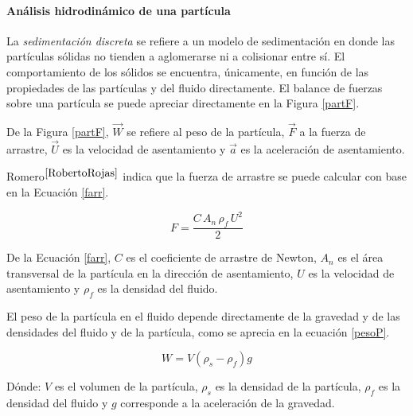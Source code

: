 \paragraph{An\'alisis hidrodin\'amico de una part\'icula} \label{hidroD}

\noindent
\justify

La \textit{sedimentaci\'on discreta} se refiere a un modelo de sedimentaci\'on en donde las part\'iculas s\'olidas no tienden a aglomerarse ni a colisionar entre s\'i. El comportamiento de los s\'olidos se encuentra, \'unicamente, en funci\'on de las propiedades de las part\'iculas y del fluido directamente. El balance de fuerzas sobre una part\'icula se puede apreciar directamente en la Figura \ref{partF}.



\noindent
\justify


De la Figura \ref{partF}, $\vec{W}$ se refiere al peso de la part\'icula, $\vec{F}$ a la fuerza de arrastre, $\vec{U}$ es la velocidad de asentamiento y $\vec{a}$ es la aceleraci\'on de asentamiento.

\noindent
\justify

Romero$^{\cite{RobertoRojas}}$ indica que la fuerza de arrastre se puede calcular con base en la Ecuaci\'on \ref{farr}.

\begin{equation}
	F = \frac{C \, A_n \, \rho _f \, U^2}{2}
	\label{farr}
\end{equation}

\noindent
\justify

De la Ecuaci\'on \ref{farr}, $C$ es el coeficiente de arrastre de Newton, $A_n$ es el \'area transversal de la part\'icula en la direcci\'on de asentamiento, $U$ es la velocidad de asentamiento y $\rho _f$ es la densidad del fluido.

\noindent
\justify

El peso de la part\'icula en el fluido depende directamente de la gravedad y de las densidades del fluido y de la part\'icula, como se aprecia en la ecuaci\'on \ref{pesoP}.

\begin{equation}
	W = V \left(\rho _s - \rho _f \right) g
	\label{pesoP}
\end{equation}

\noindent
\justify

D\'onde: $V$ es el volumen de la part\'icula, $\rho _s$ es la densidad de la part\'icula, $\rho _f$ es la densidad del fluido y $g$ corresponde a la aceleraci\'on de la gravedad.

